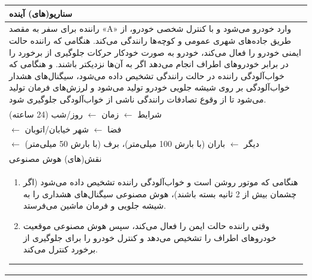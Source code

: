 \documentclass[a4paper,10pt]{article}
\begin{document}
\begin{table}[htbp]
\begin{tabularx}{\textwidth}{X}
            سناریو(های) آینده \\

            \hline

            راننده برای سفر به مقصد «A» وارد خودرو می‌شود و با کنترل شخصی خودرو، از طریق جاده‌های شهری عمومی و کوچه‌ها رانندگی می‌کند. هنگامی که راننده حالت ایمنی خودرو را فعال می‌کند، خودرو به صورت خودکار حرکات جلوگیری از برخورد را در برابر خودروهای اطراف انجام می‌دهد اگر به آن‌ها نزدیکتر باشند. و هنگامی که خواب‌آلودگی راننده در حالت رانندگی تشخیص داده می‌شود، سیگنال‌های هشدار خواب‌آلودگی بر روی شیشه جلویی خودرو تولید می‌شود و لرزش‌های فرمان تولید می‌شود تا از وقوع تصادفات رانندگی ناشی از خواب‌آلودگی جلوگیری شود. \\

            شرایط $\leftarrow$ زمان $\leftarrow$ روز/شب (24 ساعته) \\
            \hspace{24pt} $\leftarrow$ فضا $\leftarrow$ شهر خیابان/اتوبان \\
            \hspace{24pt} $\leftarrow$ دیگر $\leftarrow$ باران (با بارش 100 میلی‌متر)، برف (با بارش 50 میلی‌متر) \\

            \hline

            نقش(های) هوش مصنوعی \\

            \hline

            \vspace{-10pt}

            \begin{enumerate}
                
                \item هنگامی که موتور روشن است و خواب‌آلودگی راننده تشخیص داده می‌شود (اگر چشمان بیش از 2 ثانیه بسته باشند)، هوش مصنوعی سیگنال‌های هشداری را به شیشه جلویی و فرمان ماشین می‌فرستد.

                \item وقتی راننده حالت ایمن را فعال می‌کند، سپس هوش مصنوعی موقعیت خودروهای اطراف را تشخیص می‌دهد و کنترل خودرو را برای جلوگیری از برخورد کنترل می‌کند.

            \end{enumerate}

            \hrule

        \end{tabularx}
        
    \end{table}
\end{document}
